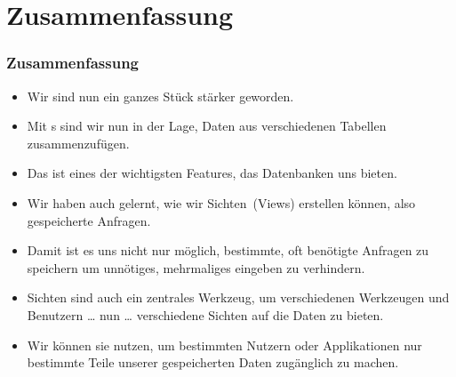 \documentclass[aspectratio=169,mathserif,notheorems]{beamer}%
\begin{document}
\section{Zusammenfassung}%
%
\begin{frame}%
\frametitle{Zusammenfassung}%
\begin{itemize}%
\item Wir sind nun ein ganzes Stück stärker geworden.%
\item<2-> Mit s sind wir nun in der Lage, Daten aus verschiedenen Tabellen zusammenzufügen.%
\item<3-> Das ist eines der wichtigsten Features, das Datenbanken uns bieten.%
\item<4-> Wir haben auch gelernt, wie wir Sichten~(Views) erstellen können, also gespeicherte Anfragen.%
\item<5-> Damit ist es uns nicht nur möglich, bestimmte, oft benötigte Anfragen zu speichern um unnötiges, mehrmaliges eingeben zu verhindern.%
\item<6-> Sichten sind auch ein zentrales Werkzeug, um verschiedenen Werkzeugen und Benutzern {\dots} nun {\dots} verschiedene Sichten auf die Daten zu bieten.%
\item<7-> Wir können sie nutzen, um bestimmten Nutzern oder Applikationen nur bestimmte Teile unserer gespeicherten Daten zugänglich zu machen.%
\end{itemize}%
\end{frame}%
%
\endPresentation%
\end{document}
